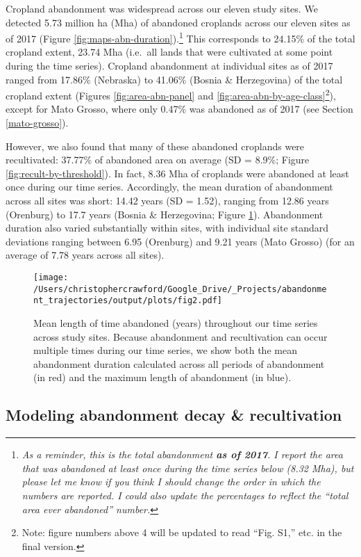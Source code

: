 \documentclass[9pt,twocolumn,twoside,lineno]{pnas-new}
\begin{document}
Cropland abandonment was widespread across our eleven study sites.
We detected 5.73 million ha (Mha) of abandoned croplands across our eleven sites as of 2017 (Figure \ref{fig:maps-abn-duration}).\footnote{\emph{As a reminder, this is the total abandonment \textbf{as of 2017}. I report the area that was abandoned at least once during the time series below (8.32 Mha), but please let me know if you think I should change the order in which the numbers are reported. I could also update the percentages to reflect the ``total area ever abandoned'' number.}}
This corresponds to 24.15\% of the total cropland extent, 23.74 Mha (i.e.~all lands that were cultivated at some point during the time series).
Cropland abandonment at individual sites as of 2017 ranged from 17.86\% (Nebraska) to 41.06\% (Bosnia \& Herzegovina) of the total cropland extent (Figures \ref{fig:area-abn-panel} and \ref{fig:area-abn-by-age-class}\footnote{Note: figure numbers above 4 will be updated to read ``Fig. S1,'' etc. in the final version.}), except for Mato Grosso, where only 0.47\% was abandoned as of 2017 (see Section \ref{mato-grosso}).

However, we also found that many of these abandoned croplands were recultivated: 37.77\% of abandoned area on average (SD = 8.9\%; Figure \ref{fig:recult-by-threshold}).
In fact, 8.36 Mha of croplands were abandoned at least once during our time series.
Accordingly, the mean duration of abandonment across all sites was short: 14.42 years (SD = 1.52), ranging from 12.86 years (Orenburg) to 17.7 years (Bosnia \& Herzegovina; Figure \ref{fig:mean-abn-duration}).
Abandonment duration also varied substantially within sites, with individual site standard deviations ranging between 6.95 (Orenburg) and 9.21 years (Mato Grosso) (for an average of 7.78 years across all sites).



\begin{figure}
\centering
\texttt{[image: /Users/christophercrawford/Google\_Drive/\_Projects/abandonment\_trajectories/output/plots/fig2.pdf]}
\caption{\label{fig:mean-abn-duration}Mean length of time abandoned (years) throughout our time series across study sites. Because abandonment and recultivation can occur multiple times during our time series, we show both the mean abandonment duration calculated across all periods of abandonment (in red) and the maximum length of abandonment (in blue).}
\end{figure}

\hypertarget{modeling-abandonment-decay-recultivation}{%
\subsection{Modeling abandonment decay \& recultivation}\label{modeling-abandonment-decay-recultivation}}
\end{document}
